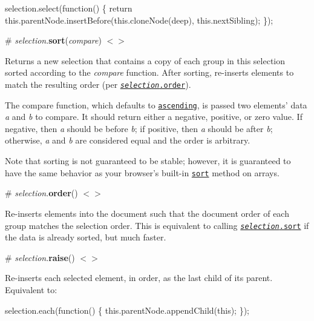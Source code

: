 \begin{DoxyCode}
selection.select(function() \{
  return this.parentNode.insertBefore(this.cloneNode(deep), this.nextSibling);
\});
\end{DoxyCode}


\label{_selection_sort}%
\# {\itshape selection}.{\bfseries sort}({\itshape compare}) \href{https://github.com/d3/d3-selection/blob/master/src/selection/sort.js}{\tt $<$$>$}

Returns a new selection that contains a copy of each group in this selection sorted according to the {\itshape compare} function. After sorting, re-\/inserts elements to match the resulting order (per \href{#selection_order}{\tt {\itshape selection}.order}).

The compare function, which defaults to \href{https://github.com/d3/d3-array#ascending}{\tt ascending}, is passed two elements’ data {\itshape a} and {\itshape b} to compare. It should return either a negative, positive, or zero value. If negative, then {\itshape a} should be before {\itshape b}; if positive, then {\itshape a} should be after {\itshape b}; otherwise, {\itshape a} and {\itshape b} are considered equal and the order is arbitrary.

Note that sorting is not guaranteed to be stable; however, it is guaranteed to have the same behavior as your browser’s built-\/in \href{https://developer.mozilla.org/en/JavaScript/Reference/Global_Objects/Array/sort}{\tt sort} method on arrays.

\label{_selection_order}%
\# {\itshape selection}.{\bfseries order}() \href{https://github.com/d3/d3-selection/blob/master/src/selection/order.js}{\tt $<$$>$}

Re-\/inserts elements into the document such that the document order of each group matches the selection order. This is equivalent to calling \href{#selection_sort}{\tt {\itshape selection}.sort} if the data is already sorted, but much faster.

\label{_selection_raise}%
\# {\itshape selection}.{\bfseries raise}() \href{https://github.com/d3/d3-selection/blob/master/src/selection/raise.js}{\tt $<$$>$}

Re-\/inserts each selected element, in order, as the last child of its parent. Equivalent to\+:


\begin{DoxyCode}
selection.each(function() \{
  this.parentNode.appendChild(this);
\});
\end{DoxyCode}


